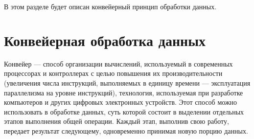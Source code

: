 \hspace{\parindent}В этом разделе будет описан конвейерный принцип обработки данных.

\section{Конвейерная обработка данных}
\hspace{\parindent}Конвейер — способ организации вычислений, используемый в современных процессорах и контроллерах с целью повышения их производительности (увеличения числа инструкций, выполняемых в единицу времени — эксплуатация параллелизма на уровне инструкций), технология, используемая при разработке компьютеров и других цифровых электронных устройств\cite{conveyor}. Этот способ можно использовать в обработке данных, суть которой состоит в выделении отдельных этапов выполнения общей операции. Каждый этап, выполнив свою работу, передает результат следующему, одновременно принимая новую порцию данных. 



